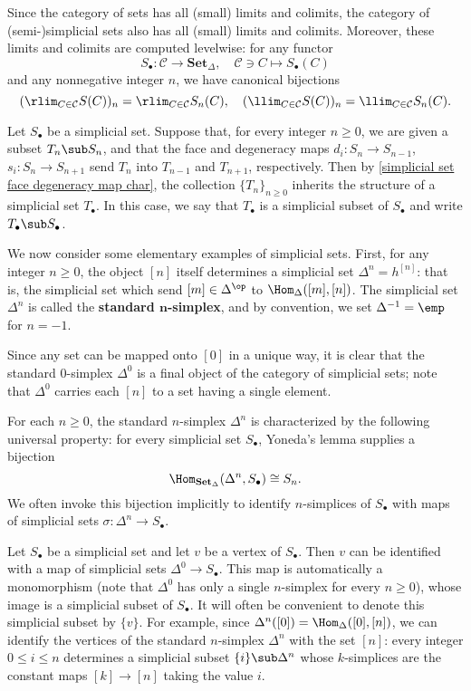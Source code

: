 \begin{remark}
Since the category of sets has all (small) limits and colimits, the category of (semi-)simplicial sets also has all (small) limits and colimits. Moreover, these limits and colimits are computed levelwise: for any functor
\[S_\bullet:\mathcal{C}\to\mathbf{Set}_{\Delta},\quad \mathcal{C}\ni C\mapsto S_\bullet(C)\]
and any nonnegative integer $n$, we have canonical bijections
\[(\rlim_{C\in\mathcal{C}}S(C))_n=\rlim_{C\in\mathcal{C}}S_n(C),\quad (\llim_{C\in\mathcal{C}}S(C))_n=\llim_{C\in\mathcal{C}}S_n(C).\]
\end{remark}
\begin{example}
Let $S_\bullet$ be a simplicial set. Suppose that, for every integer $n\geq 0$, we are given a subset $T_n\sub S_n$, and that the face and degeneracy maps $d_i:S_n\to S_{n-1}$, $s_i:S_n\to S_{n+1}$ send $T_n$ into $T_{n-1}$ and $T_{n+1}$, respectively. Then by \cref{simplicial set face degeneracy map char}, the collection $\{T_n\}_{n\geq 0}$ inherits the structure of a simplicial set $T_\bullet$. In this case, we say that $T_\bullet$ is a simplicial subset of $S_\bullet$ and write $T_\bullet\sub S_\bullet$.
\end{example}
We now consider some elementary examples of simplicial sets. First, for any integer $n\geq 0$, the object $[n]$ itself determines a simplicial set $\Delta^n=h^{[n]}$: that is, the simplicial set which send $[m]\in\Delta^{\op}$ to $\Hom_\Delta([m],[n])$. The simplicial set $\Delta^n$ is called the \textbf{standard $\bm{n}$-simplex}, and by convention, we set $\Delta^{-1}=\emp$ for $n=-1$.\par
Since any set can be mapped onto $[0]$ in a unique way, it is clear that the standard $0$-simplex $\Delta^0$ is a final object of the category of simplicial sets; note that $\Delta^0$ carries each $[n]$ to a set having a single element.\par
For each $n\geq 0$, the standard $n$-simplex $\Delta^n$ is characterized by the following universal property: for every simplicial set $S_\bullet$, Yoneda's lemma supplies a bijection
\[\Hom_{\mathbf{Set}_{\Delta}}(\Delta^n,S_\bullet)\cong S_n.\]
We often invoke this bijection implicitly to identify $n$-simplices of $S_\bullet$ with maps of simplicial sets $\sigma:\Delta^n\to S_\bullet$.
\begin{example}
Let $S_\bullet$ be a simplicial set and let $v$ be a vertex of $S_\bullet$. Then $v$ can be identified with a map of simplicial sets $\Delta^0\to S_\bullet$. This map is automatically a monomorphism (note that $\Delta^0$ has only a single $n$-simplex for every $n\geq 0$), whose image is a simplicial subset of $S_\bullet$. It will often be convenient to denote this simplicial subset by $\{v\}$. For example, since $\Delta^n([0])=\Hom_{\Delta}([0],[n])$, we can identify the vertices of the standard $n$-simplex $\Delta^n$ with the set $[n]$: every integer $0\leq i\leq n$ determines a simplicial subset $\{i\}\sub\Delta^n$ whose $k$-simplices are the constant maps $[k]\to[n]$ taking the value $i$.
\end{example}
